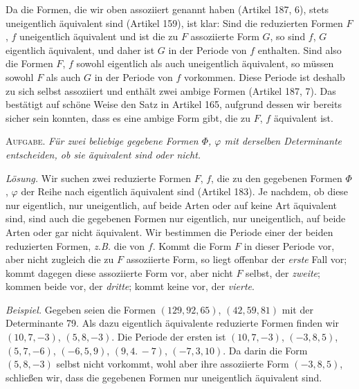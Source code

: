 Da die Formen, die wir oben assoziiert genannt haben (Artikel 187, 6), stets uneigentlich äquivalent sind (Artikel 159), ist klar: Sind die reduzierten Formen $F$, $f$ uneigentlich äquivalent und ist die zu $F$ assoziierte Form $G$, so sind $f$, $G$ eigentlich äquivalent, und daher ist $G$ in der Periode von $f$ enthalten. Sind also die Formen $F$, $f$ sowohl eigentlich als auch uneigentlich äquivalent, so müssen sowohl $F$ als auch $G$ in der Periode von $f$ vorkommen. Diese Periode ist deshalb zu sich selbst assoziiert und enthält zwei ambige Formen (Artikel 187, 7). Das bestätigt auf schöne Weise den Satz in Artikel 165, aufgrund dessen wir bereits sicher sein konnten, dass es eine ambige Form gibt, die zu $F$, $f$ äquivalent ist.

\textsc{Aufgabe.} \textit{Für zwei beliebige gegebene Formen $\Phi$, $\varphi$ mit derselben Determinante entscheiden, ob sie äquivalent sind oder nicht.}

\textit{Lösung.} Wir suchen zwei reduzierte Formen $F$, $f$, die zu den gegebenen Formen $\Phi$, $\varphi$ der Reihe nach eigentlich äquivalent sind (Artikel 183). Je nachdem, ob diese nur eigentlich, nur uneigentlich, auf beide Arten oder auf keine Art äquivalent sind, sind auch die gegebenen Formen nur eigentlich, nur uneigentlich, auf beide Arten oder gar nicht äquivalent. Wir bestimmen die Periode einer der beiden reduzierten Formen, \textit{z.B.} die von $f$. Kommt die Form $F$ in dieser Periode vor, aber nicht zugleich die zu $F$ assoziierte Form, so liegt offenbar der \textit{erste} Fall vor; kommt dagegen diese assoziierte Form vor, aber nicht $F$ selbst, der \textit{zweite}; kommen beide vor, der \textit{dritte}; kommt keine vor, der \textit{vierte}.

\textit{Beispiel.} Gegeben seien die Formen $(129,92,65)$, $(42,59,81)$ mit der Determinante 79. Als dazu eigentlich äquivalente reduzierte Formen finden wir $(10,7,-3)$, $(5,8,-3)$. Die Periode der ersten ist $(10,7,-3)$, $(-3,8,5)$, $(5,7,-6)$, $(-6,5,9)$, $(9,4.\,-7)$, $(-7,3,10)$. Da darin die Form $(5,8,-3)$ selbst nicht vorkommt,
wohl aber ihre assoziierte Form $(-3,8,5)$, schließen wir, dass die gegebenen Formen nur uneigentlich äquivalent sind.

